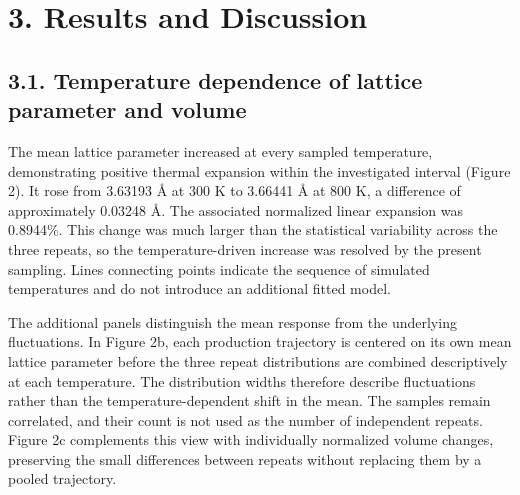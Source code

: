 \documentclass[10pt,a4paper,twocolumn]{article}
\begin{document}
\section*{3. Results and Discussion}

\subsection*{3.1. Temperature dependence of lattice parameter and volume}

The mean lattice parameter increased at every sampled temperature, demonstrating positive thermal expansion within the investigated interval (Figure 2). It rose from 3.63193 Å at 300 K to 3.66441 Å at 800 K, a difference of approximately 0.03248 Å. The associated normalized linear expansion was 0.8944\%. This change was much larger than the statistical variability across the three repeats, so the temperature-driven increase was resolved by the present sampling. Lines connecting points indicate the sequence of simulated temperatures and do not introduce an additional fitted model.


The additional panels distinguish the mean response from the underlying fluctuations. In Figure 2b, each production trajectory is centered on its own mean lattice parameter before the three repeat distributions are combined descriptively at each temperature. The distribution widths therefore describe fluctuations rather than the temperature-dependent shift in the mean. The samples remain correlated, and their count is not used as the number of independent repeats. Figure 2c complements this view with individually normalized volume changes, preserving the small differences between repeats without replacing them by a pooled trajectory.
\end{document}
